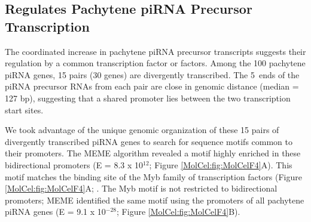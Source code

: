   \subsection{\amyb{} Regulates Pachytene piRNA Precursor Transcription}
    \label{MolCel:subsec:A-Myb controls Pachytene precursor Tx}

    The coordinated increase in pachytene piRNA precursor transcripts suggests their regulation by a common transcription factor or factors. Among the 100 pachytene piRNA genes, 15 pairs (30 genes) are divergently transcribed. The 5\textprime~ends of the piRNA precursor RNAs from each pair are close in genomic distance (median = 127 bp), suggesting that a shared promoter lies between the two transcription start sites.
     
    We took advantage of the unique genomic organization of these 15 pairs of divergently transcribed piRNA genes to search for sequence motifs common to their promoters. The MEME algorithm \citep{Bailey1994} revealed a motif highly enriched in these bidirectional promoters (E = 8.3 x 10$^{12}$; Figure \ref{MolCel:fig:MolCelF4}A). This motif matches the binding site of the Myb family of transcription factors (Figure \ref{MolCel:fig:MolCelF4}A; \citep{Gupta2007, Newburger2009}. The Myb motif is not restricted to bidirectional promoters; MEME identified the same motif using the promoters of all pachytene piRNA genes (E = 9.1 x 10$^{-28}$; Figure \ref{MolCel:fig:MolCelF4}B).

